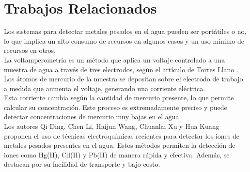 \section{Trabajos Relacionados}
Los sistemas para detectar metales pesados en el agua pueden ser portátiles o no, lo que implica un alto consumo de recursos en algunos casos y un uso mínimo de recursos en otros. \\

La voltamperometría es un método que aplica un voltaje controlado a una muestra de agua a través de tres electrodos, según el artículo de Torres Llano \cite{torres2015}. Los átomos de mercurio de la muestra se depositan sobre el electrodo de trabajo a medida que aumenta el voltaje, generando una corriente eléctrica.\\

Esta corriente cambia según la cantidad de mercurio presente, lo que permite calcular su concentración. Este proceso es extremadamente preciso y puede detectar concentraciones de mercurio muy bajas en el agua. \\

Los autores Qi Ding, Chen Li, Haijun Wang, Chuanlai Xu y Hua Kuang \cite{ding2021} proponen el uso de técnicas electroquímicas recientes para detectar los iones de metales pesados presentes en el agua. Estos métodos permiten la detección de iones como Hg(II), Cd(II) y Pb(II) de manera rápida y efectiva. Además, se destacan por su facilidad de transporte y bajo costo.